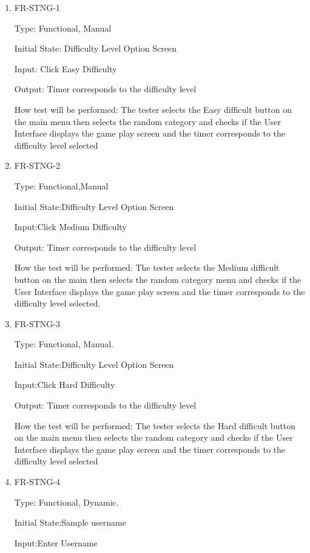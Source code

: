 \documentclass[12pt, titlepage]{article}
\begin{document}
\begin{enumerate}	
	\item{FR-STNG-1\\}
	
	Type: Functional, Manual
	
	Initial State: Difficulty Level Option Screen
	
	Input:  Click Easy Difficulty
	
	Output:  Timer corresponds to the difficulty level
	
	How test will be performed: The tester selects the Easy difficult button on the main menu then selects the random category and checks if the User Interface displays the game play screen and the timer corresponds to the difficulty level selected
	
	\item{FR-STNG-2\\}
	
Type: Functional,Manual

Initial State:Difficulty Level Option Screen

Input:Click Medium Difficulty

Output: Timer corresponds to the difficulty level

How the test will be performed: The tester selects the Medium difficult button on the main then selects the random category menu and checks if the User Interface displays the game play screen and the timer corresponds to the difficulty level selected. 	
	
	\item{FR-STNG-3\\}

Type: Functional, Manual.

Initial State:Difficulty Level Option Screen

Input:Click Hard Difficulty

Output: Timer corresponds to the difficulty level

How the test will be performed: The tester selects the Hard difficult button on the main menu then selects the random category and checks if the User Interface displays the game play screen and the timer corresponds to the difficulty level selected

\item{FR-STNG-4\\}

Type: Functional, Dynamic.

Initial State:Sample username

Input:Enter Username


\end{enumerate}
\end{document}
